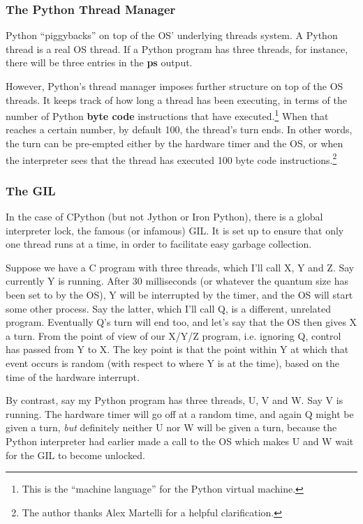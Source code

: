 \subsubsection{The Python Thread Manager}

Python ``piggybacks'' on top of the OS' underlying threads system.  A
Python thread is a real OS thread.   If a Python program has three
threads, for instance, there will be three entries in the {\bf ps}
output.

However, Python's thread manager imposes further structure on top of the
OS threads.  It keeps track of how long a thread has been executing, in
terms of the number of Python {\bf byte code} instructions that have
executed.\footnote{This is the ``machine language'' for the Python
virtual machine.}  When that reaches a certain number, by default 100,
the thread's turn ends.  In other words, the turn can be pre-empted
either by the hardware timer and the OS, or when the interpreter sees
that the thread has executed 100 byte code instructions.\footnote{The
author thanks Alex Martelli for a helpful clarification.}

\subsubsection{The GIL}
\label{gil}

In the case of CPython (but not Jython or Iron Python), there is a
global interpreter lock, the famous (or infamous) GIL.  It is set up to
ensure that only one thread runs at a time, in order to facilitate easy
garbage collection.

Suppose we have a C program with three threads, which I'll call X, Y and
Z.  Say currently Y is running.  After 30 milliseconds (or whatever the
quantum size has been set to by the OS), Y will be interrupted by the
timer, and the OS will start some other process.  Say the latter, which
I'll call Q, is a different, unrelated program.  Eventually Q's turn
will end too, and let's say that the OS then gives X a turn.  From the
point of view of our X/Y/Z program, i.e. ignoring Q, control has passed
from Y to X.  The key point is that the point within Y at which that
event occurs is random (with respect to where Y is at the time), based
on the time of the hardware interrupt.

By contrast, say my Python program has three threads, U, V and W.  Say V
is running.  The hardware timer will go off at a random time, and again
Q might be given a turn, {\it but} definitely neither U nor W will be
given a turn, because the Python interpreter had earlier made a call to
the OS which makes U and W wait for the GIL to become unlocked.

